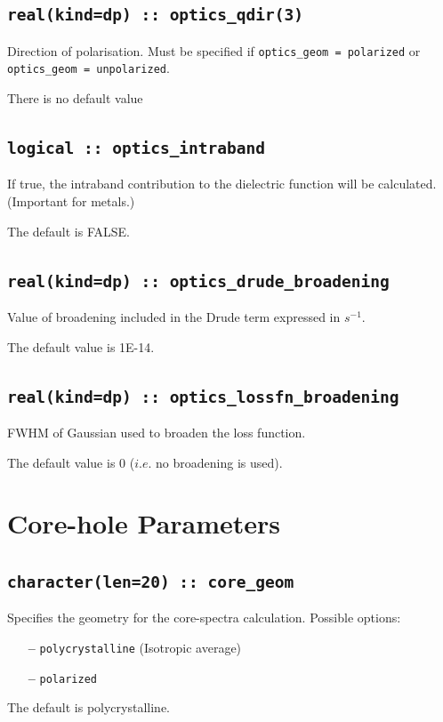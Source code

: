 \documentclass[a4paper,11pt,twoside]{book}
\begin{document}
{\subsection[optics\_qdir]{\tt real(kind=dp) :: optics\_qdir(3)}
Direction of polarisation. Must be specified if \verb#optics_geom = polarized#  
or \verb#optics_geom = unpolarized#.

There is no default value

\subsection[optics\_intraband]{\tt logical :: optics\_intraband}
If true, the intraband contribution to the dielectric function will be calculated.  (Important for metals.)    

The default is FALSE.

\subsection[optics\_drude\_broadening]{\tt real(kind=dp) :: optics\_drude\_broadening}
Value of broadening included in the Drude term expressed in $s^{-1}$.  

The default value is 1E-14.  

\subsection[optics\_lossfn\_broadening]{\tt real(kind=dp) :: optics\_lossfn\_broadening}
FWHM of Gaussian used to broaden the loss function.  

The default value is 0 ($i.e.$ no broadening is used).  


\section{Core-hole Parameters}

\subsection[core\_geom]{\tt character(len=20) :: core\_geom}

Specifies the geometry for the core-spectra calculation.  Possible options: 
\begin{itemize}
\item[{\bf --}]  \verb#polycrystalline# (Isotropic average)
\item[{\bf --}]  \verb#polarized#  
\end{itemize}
The default is polycrystalline.

}
\end{document}
